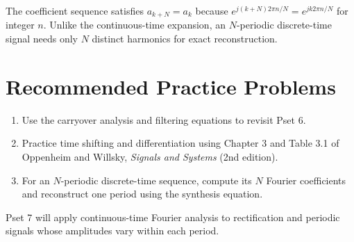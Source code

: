 The coefficient sequence satisfies $a_{k+N}=a_k$ because
$e^{j(k+N)2\pi n/N}=e^{jk2\pi n/N}$ for integer $n$.
Unlike the continuous-time expansion, an $N$-periodic discrete-time signal
needs only $N$ distinct harmonics for exact reconstruction.

\section{Recommended Practice Problems}
\begin{enumerate}
  \item Use the carryover analysis and filtering equations to revisit Pset 6.
  \item Practice time shifting and differentiation using Chapter 3 and
  Table 3.1 of Oppenheim and Willsky, \emph{Signals and Systems} (2nd edition).
  \item For an $N$-periodic discrete-time sequence, compute its $N$ Fourier
  coefficients and reconstruct one period using the synthesis equation.
\end{enumerate}
Pset 7 will apply continuous-time Fourier analysis to rectification and
periodic signals whose amplitudes vary within each period.
